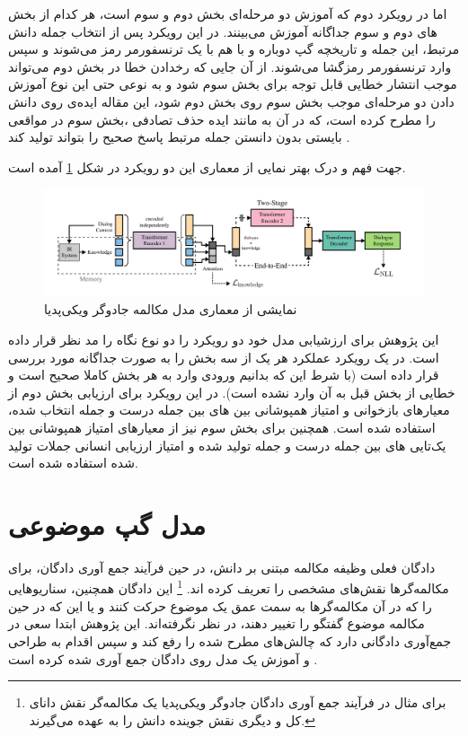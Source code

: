 اما در رویکرد دوم که آموزش دو مرحله‌ای بخش دوم و سوم است، هر کدام از بخش ‌های دوم و سوم جداگانه آموزش می‌بینند. در این رویکرد پس از انتخاب جمله دانش مرتبط، این جمله و تاریخچه گپ دوباره و با هم با یک ترنسفورمر رمز می‌شوند و سپس وارد ترنسفورمر رمزگشا می‌شوند. از آن جایی که رخدادن خطا در بخش دوم می‌تواند موجب انتشار خطایی قابل توجه برای بخش سوم شود و به نوعی حتی این نوع آموزش دادن دو مرحله‌ای موجب
 بخش سوم روی بخش دوم شود، این مقاله ایده‌ی 
 روی دانش را مطرح کرده است، که در آن به مانند ایده حذف تصادفی
،بخش سوم در مواقعی بایستی بدون دانستن جمله مرتبط   پاسخ صحیح را بتواند تولید کند
\cite{wizard}.

  جهت فهم و درک بهتر نمایی از معماری این دو رویکرد در شکل
\ref{fig:chap2:wizard-arch}
آمده است.

 \begin{figure}[H]
	\centering
	\includegraphics[width=1\textwidth]{images/chap2/wizard_arch.png}
	\caption[نمایشی از معماری مدل مکالمه جادوگر ویکی‌پدیا]
	{نمایشی از معماری مدل مکالمه جادوگر ویکی‌پدیا
		\cite{wizard}}	
	\label{fig:chap2:wizard-arch}
\end{figure}

این پژوهش برای ارزشیابی مدل خود دو رویکرد را دو نوع نگاه را مد نظر قرار داده است. در یک رویکرد عملکرد هر یک از سه بخش را به صورت جداگانه مورد بررسی قرار داده است (با شرط این که بدانیم ورودی وارد به هر بخش کاملا صحیح است و خطایی از بخش قبل به آن وارد نشده است). در این رویکرد برای ارزیابی بخش دوم از معیارهای بازخوانی و امتیاز 
همپوشانی
بین 
‌های بین جمله درست و جمله انتخاب شده، استفاده شده است. همچنین برای بخش سوم نیز از معیار‌های 
امتیاز 
همپوشانی
بین 
یک‌تایی
‌های بین جمله درست و جمله تولید شده
و امتیاز ارزیابی انسانی جملات تولید شده استفاده شده است.


\section{مدل گپ موضوعی}

دادگان فعلی وظیفه مکالمه مبتنی بر دانش،‌ در حین فرآیند جمع آوری دادگان،‌ برای مکالمه‌گرها نقش‌های مشخصی را تعریف کرده اند.
\footnote{برای مثال در فرآیند جمع آوری دادگان جادوگر ویکی‌پدیا یک مکالمه‌گر نقش دانای کل و دیگری نقش جوینده دانش را به عهده می‌گیرند.}
 این دادگان همچنین، سناریو‌هایی را که در آن مکالمه‌گرها به سمت عمق یک  موضوع حرکت کنند و یا این که در حین مکالمه موضوع گفتگو را تغییر دهند، در نظر نگرفته‌اند. این پژوهش ابتدا سعی در جمع‌آوری دادگانی دارد که چالش‌های مطرح شده را رفع کند و سپس اقدام به طراحی و آموزش یک مدل روی دادگان جمع آوری شده کرده است
 \cite{Topical_Chat}.

